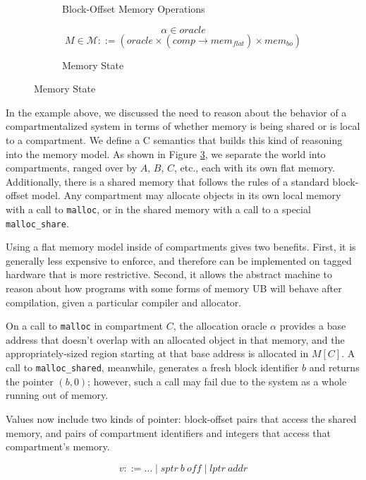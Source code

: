 \documentclass{article}
\begin{document}
\begin{figure}
\begin{subfigure}{0.5\textwidth}
    \caption{Block-Offset Memory Operations}
    \label{fig:blockoff}
  \end{subfigure}

  \begin{subfigure}{1\textwidth}
    \[\alpha \in \mathit{oracle}\]
    \[M \in \mathcal{M} ::= (\mathit{oracle} \times (\mathit{comp} \rightarrow
    \mathit{mem}_{\mathit{flat}}) \times \mathit{mem}_{bo})\]
    
    
    \caption{Memory State}
    \label{fig:integrated}
  \end{subfigure}

  \caption{Memory State}
  \label{fig:memmod}
\end{figure}

In the example above, we discussed the need to reason about the behavior of a compartmentalized
system in terms of whether memory is being shared or is local to a compartment.
We define a C semantics that builds this kind of reasoning into the memory model.
As shown in Figure \ref{fig:memmod}, we separate the world
into compartments, ranged over by \(A\), \(B\), \(C\), etc., each with its own flat memory.
Additionally, there is a shared memory that follows the
rules of a standard block-offset model. Any compartment may allocate objects in its own
local memory with a call to {\tt malloc}, or in the shared memory with a call to a special
{\tt malloc\_share}.

Using a flat memory model inside of compartments gives two benefits. First, it is generally
less expensive to enforce, and therefore can be implemented on tagged hardware that is more
restrictive. Second, it allows the abstract machine to reason about how programs with some
forms of memory UB will behave after compilation, given a particular compiler and allocator.

On a call to {\tt malloc} in compartment \(C\), the allocation oracle \(\alpha\) provides a base
address that doesn't overlap with an allocated object in that memory, and the appropriately-sized
region starting at that base address is allocated in \(M[C]\).
A call to {\tt malloc\_shared}, meanwhile, generates a fresh block identifier \(b\)
and returns the pointer \((b,0)\); however, such a call may fail due to the system as a whole
running out of memory.

Values now include two kinds of pointer: block-offset pairs that access the shared memory,
and pairs of compartment identifiers and integers that access that compartment's memory.

\[v ::= \dots \mid \mathit{sptr} ~ b ~ \mathit{off} \mid \mathit{lptr} ~ \mathit{addr}\]
\end{document}
